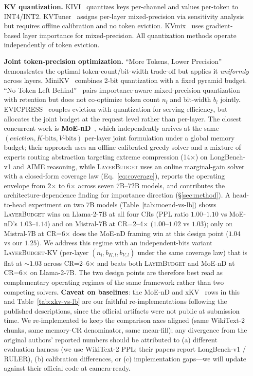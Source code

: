 \documentclass{article}
\newcommand{\layerbudget}{\textsc{LayerBudget}\xspace}
\begin{document}
\textbf{KV quantization.}
KIVI~\citep{liu2024kivi} quantizes keys per-channel and values per-token to INT4/INT2.
KVTuner~\citep{kvtuner2025} assigns per-layer mixed-precision via sensitivity analysis but requires offline calibration and no token eviction.
KVmix~\citep{kvmix2026} uses gradient-based layer importance for mixed-precision.
All quantization methods operate independently of token eviction.

\textbf{Joint token-precision optimization.}
``More Tokens, Lower Precision''~\citep{moretokenslowerprecision2025} demonstrates the optimal token-count/bit-width trade-off but applies it \emph{uniformly} across layers.
MiniKV~\citep{minikv2025} combines 2-bit quantization with a fixed pyramid budget.
``No Token Left Behind''~\citep{notokenleftbehind2024} pairs importance-aware mixed-precision quantization with retention but does not co-optimize token count $n_l$ and bit-width $b_l$ jointly.
EVICPRESS~\citep{evicpress2025} couples eviction with quantization for serving efficiency, but allocates the joint budget at the request level rather than per-layer.
The closest concurrent work is \textbf{MoE-nD}~\citep{moend2026}, which independently arrives at the same $(eviction, K\text{-bits}, V\text{-bits})$ per-layer joint formulation under a global memory budget; their approach uses an offline-calibrated greedy solver and a mixture-of-experts routing abstraction targeting extreme compression (14$\times$) on LongBench-v1 and AIME reasoning, while \layerbudget uses an online marginal-gain solver with a closed-form coverage law (Eq.~\ref{eq:coverage}), reports the operating envelope from 2$\times$ to 6$\times$ across seven 7B--72B models, and contributes the architecture-dependence finding for importance direction (\S\ref{sec:method}). A head-to-head experiment on two 7B models (Table~\ref{tab:moend-vs-lb}) shows \layerbudget wins on Llama-2-7B at all four CRs (PPL ratio $1.00$--$1.10$ vs MoE-nD's $1.03$--$1.14$) and on Mistral-7B at CR=2--4$\times$ ($1.00$--$1.02$ vs $1.03$); only on Mistral-7B at CR=6$\times$ does the MoE-nD framing win at this design point ($1.04$ vs our $1.25$). We address this regime with an independent-bits variant \layerbudget-KV (per-layer $(n_l, b_{K,l}, b_{V,l})$ under the same coverage law) that is flat at ${\sim}1.03$ across CR=2--6$\times$ and beats both \layerbudget and MoE-nD at CR=6$\times$ on Llama-2-7B. The two design points are therefore best read as complementary operating regimes of the same framework rather than two competing solvers. \textbf{Caveat on baselines}: the MoE-nD and xKV~\citep{xkv2025} rows in this and Table~\ref{tab:xkv-vs-lb} are our faithful re-implementations following the published descriptions, since the official artifacts were not public at submission time. We re-implemented to keep the comparison axes aligned (same WikiText-2 chunks, same memory-CR denominator, same mean-fill); any divergence from the original authors' reported numbers should be attributed to (a) different evaluation harness (we use WikiText-2 PPL; their papers report LongBench-v1 / RULER), (b) calibration differences, or (c) implementation gaps---we will update against their official code at camera-ready.
\end{document}
